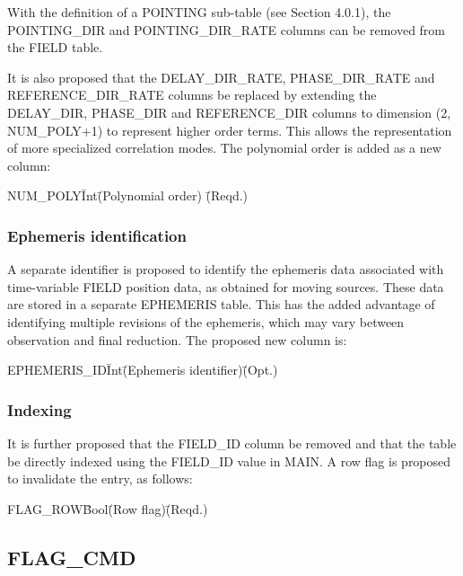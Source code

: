 \documentclass{article}
\begin{document}
\begin{itemize}
With the definition of a POINTING sub-table (see Section 4.0.1), the
POINTING\_DIR and POINTING\_DIR\_RATE columns can be removed from the
FIELD table. 

It is also proposed that the DELAY\_DIR\_RATE, PHASE\_DIR\_RATE and
REFERENCE\_DIR\_RATE columns be replaced by extending the DELAY\_DIR,
PHASE\_DIR and REFERENCE\_DIR columns to dimension (2, NUM\_POLY+1) to
represent higher order terms. This allows the representation of more
specialized correlation modes. The polynomial order is added as a new
column:

\begin{tabbing}
NUM\_POLY\quad\quad \= Int\quad\quad \= (Polynomial order)
 \quad\quad \= (Reqd.) \\
\end{tabbing}

\subsubsection{Ephemeris identification}

A separate identifier is proposed to identify the ephemeris data
associated with time-variable FIELD position data, as obtained for
moving sources. These data are stored in a separate EPHEMERIS
table. This has the added advantage of identifying multiple revisions
of the ephemeris, which may vary between observation and final
reduction. The proposed new column is:

\begin{tabbing} 
EPHEMERIS\_ID\quad\quad  \= Int\quad\quad\quad\quad \= 
(Ephemeris identifier)\quad\quad\quad\quad \= (Opt.) \\
\end{tabbing}

\subsubsection{Indexing}

It is further proposed that the FIELD\_ID column be removed and that
the table be directly indexed using the FIELD\_ID value in MAIN. A
row flag is proposed to invalidate the entry, as follows:

\begin{tabbing}
FLAG\_ROW\quad\quad  \= Bool\quad\quad \= (Row flag)\quad\quad \= (Reqd.)\\
\end{tabbing}

\subsection{FLAG\_CMD}


\end{itemize}
\end{document}
